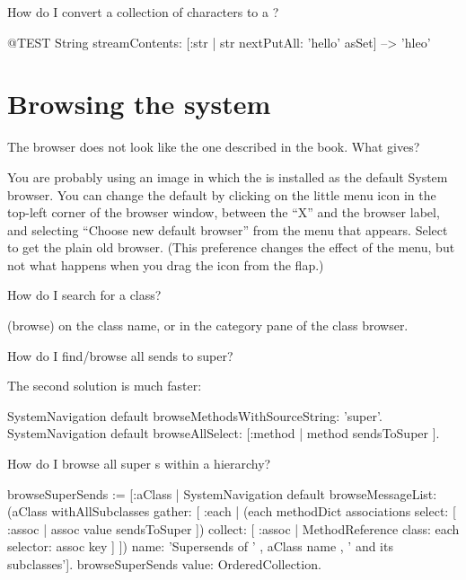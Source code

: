 \documentclass[a4paper,10pt,twoside]{book}
\begin{document}
\begin{faq}
How do I convert a collection of characters to a ?
\end{faq}
\answer
\begin{code}{@TEST}
String streamContents: [:str | str nextPutAll: 'hello' asSet] --> 'hleo'
\end{code}

\section{Browsing the system}


\begin{faq}\label{faq:omnibrowser}
The browser does not look like the one described in the book. What gives?
\end{faq}
\answer
You are probably using an image in which the  is installed as the default System browser.  You can change the default by clicking on the little menu icon in the top-left corner of the browser window, between the ``\textsf{X}'' and the browser label, and selecting ``Choose new default browser'' from the menu that appears. Select  to get the plain old browser.  (This preference changes the effect of the  menu, but not what happens when you drag the  icon from the  flap.)

\begin{faq}
How do I search for a class?
\end{faq}
\answer
{} (browse) on the class name, or  in the category pane of the class browser.

\begin{faq}
How do I find/browse all sends to super?
\end{faq}
\answer
The second solution is much faster:
\begin{code}{}
SystemNavigation default browseMethodsWithSourceString: 'super'.
SystemNavigation default browseAllSelect: [:method | method sendsToSuper ].
\end{code}

\begin{faq}
How do I browse all super s within a hierarchy?
\end{faq}
\answer
\begin{code}{}
browseSuperSends := [:aClass | SystemNavigation default
	browseMessageList: (aClass withAllSubclasses gather: [ :each |
		(each methodDict associations
			select: [ :assoc | assoc value sendsToSuper ])
				collect: [ :assoc | MethodReference class: each selector: assoc key ] ])
	name: 'Supersends of ' , aClass name , ' and its subclasses'].
browseSuperSends value: OrderedCollection.
\end{code}
\end{document}
